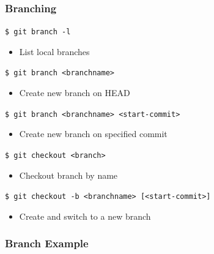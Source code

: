 \documentclass[english,compress]{beamer}
\begin{document}
\begin{frame}[fragile]
    \frametitle{Branching}

    \verb|$ git branch -l|
    \begin{itemize}
        \item List local branches
    \end{itemize}

    \verb|$ git branch <branchname> |
    \begin{itemize}
        \item Create new branch on HEAD
    \end{itemize}

    \verb|$ git branch <branchname> <start-commit>|
    \begin{itemize}
        \item Create new branch on specified commit
    \end{itemize}

    \verb|$ git checkout <branch>|
    \begin{itemize}
        \item Checkout branch by name
    \end{itemize}

    \verb|$ git checkout -b <branchname> [<start-commit>]|
    \begin{itemize}
        \item Create and switch to a new branch
    \end{itemize}
\end{frame}

\begin{frame}[fragile]
    \frametitle{Branch Example}
\end{frame}
\end{document}
